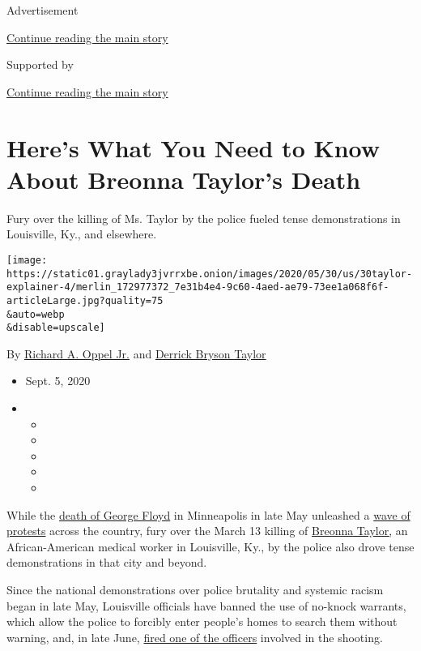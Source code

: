Advertisement

\protect\hyperlink{after-top}{Continue reading the main story}

Supported by

\protect\hyperlink{after-sponsor}{Continue reading the main story}

\hypertarget{heres-what-you-need-to-know-about-breonna-taylors-death}{%
\section{Here's What You Need to Know About Breonna Taylor's
Death}\label{heres-what-you-need-to-know-about-breonna-taylors-death}}

Fury over the killing of Ms. Taylor by the police fueled tense
demonstrations in Louisville, Ky., and elsewhere.

\texttt{[image: https://static01.graylady3jvrrxbe.onion/images/2020/05/30/us/30taylor-explainer-4/merlin\_172977372\_7e31b4e4-9c60-4aed-ae79-73ee1a068f6f-articleLarge.jpg?quality=75\\\&auto=webp\\\&disable=upscale]}

By
\href{https://www.nytimes3xbfgragh.onion/by/richard-a-oppel-jr}{Richard
A. Oppel Jr.} and
\href{https://www.nytimes3xbfgragh.onion/by/derrick-bryson-taylor}{Derrick
Bryson Taylor}

\begin{itemize}
\item
  Sept. 5, 2020
\item
  \begin{itemize}
  \item
  \item
  \item
  \item
  \item
  \end{itemize}
\end{itemize}

While the
\href{https://www.nytimes3xbfgragh.onion/2020/05/29/us/minneapolis-police-george-floyd.html}{death
of George Floyd} in Minneapolis in late May unleashed a
\href{https://www.nytimes3xbfgragh.onion/news-event/george-floyd-protests-minneapolis-new-york-los-angeles}{wave
of protests} across the country, fury over the March 13 killing of
\href{https://www.nytimes3xbfgragh.onion/2020/08/30/us/breonna-taylor-police-killing.html}{Breonna
Taylor,} an African-American medical worker in Louisville, Ky., by the
police also drove tense demonstrations in that city and beyond.

Since the national demonstrations over police brutality and systemic
racism began in late May, Louisville officials have banned the use of
no-knock warrants, which allow the police to forcibly enter people's
homes to search them without warning, and, in late June,
\href{https://www.nytimes3xbfgragh.onion/2020/06/23/us/breonna-taylor-brett-hankison-fired.html}{fired
one of the officers} involved in the shooting.

